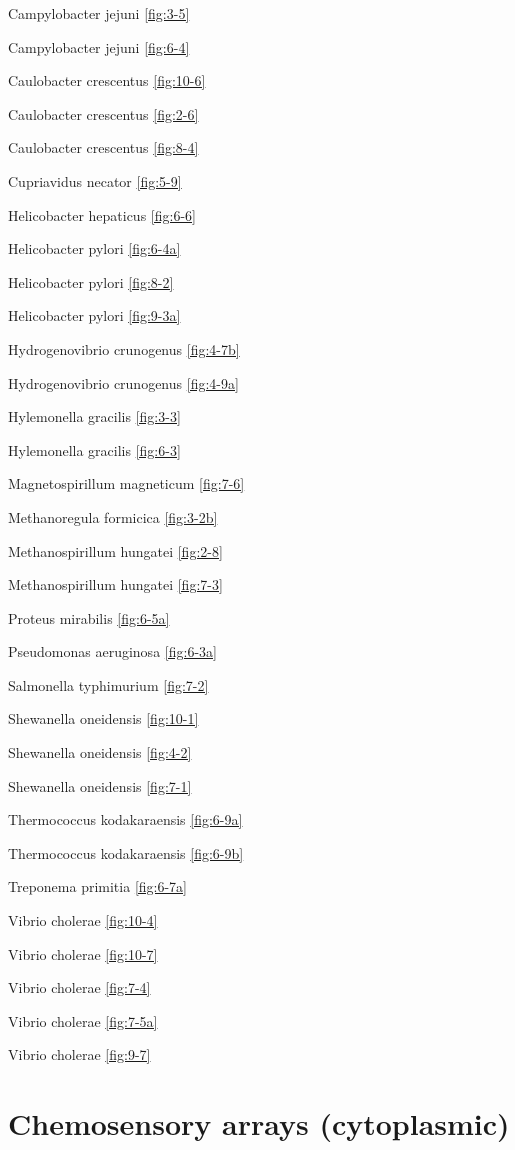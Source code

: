 \documentclass[]{tufte-book}
\begin{document}
Campylobacter jejuni \ref{fig:3-5}

Campylobacter jejuni \ref{fig:6-4}

Caulobacter crescentus \ref{fig:10-6}

Caulobacter crescentus \ref{fig:2-6}

Caulobacter crescentus \ref{fig:8-4}

Cupriavidus necator \ref{fig:5-9}

Helicobacter hepaticus \ref{fig:6-6}

Helicobacter pylori \ref{fig:6-4a}

Helicobacter pylori \ref{fig:8-2}

Helicobacter pylori \ref{fig:9-3a}

Hydrogenovibrio crunogenus \ref{fig:4-7b}

Hydrogenovibrio crunogenus \ref{fig:4-9a}

Hylemonella gracilis \ref{fig:3-3}

Hylemonella gracilis \ref{fig:6-3}

Magnetospirillum magneticum \ref{fig:7-6}

Methanoregula formicica \ref{fig:3-2b}

Methanospirillum hungatei \ref{fig:2-8}

Methanospirillum hungatei \ref{fig:7-3}

Proteus mirabilis \ref{fig:6-5a}

Pseudomonas aeruginosa \ref{fig:6-3a}

Salmonella typhimurium \ref{fig:7-2}

Shewanella oneidensis \ref{fig:10-1}

Shewanella oneidensis \ref{fig:4-2}

Shewanella oneidensis \ref{fig:7-1}

Thermococcus kodakaraensis \ref{fig:6-9a}

Thermococcus kodakaraensis \ref{fig:6-9b}

Treponema primitia \ref{fig:6-7a}

Vibrio cholerae \ref{fig:10-4}

Vibrio cholerae \ref{fig:10-7}

Vibrio cholerae \ref{fig:7-4}

Vibrio cholerae \ref{fig:7-5a}

Vibrio cholerae \ref{fig:9-7}

\section{\texorpdfstring{\textbf{Chemosensory arrays
(cytoplasmic)}}{Chemosensory arrays (cytoplasmic)}}\label{chemosensory-arrays-cytoplasmic}
\end{document}
